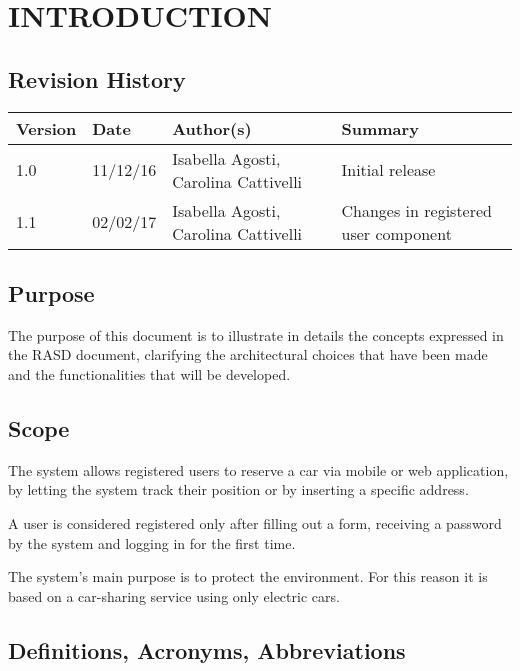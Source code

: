 \section{INTRODUCTION}
\subsection{Revision History}
\begin{table}[h]
	\centering
	\begin{tabular}{| m{1.5cm} | m{1.6cm} | m{5cm} | m{3.9cm} |}
		\hline
		\textbf{Version} & \textbf{Date} & \textbf{Author(s)} & \textbf{Summary}\\
		\hline
		1.0 & 11/12/16 & Isabella Agosti, Carolina Cattivelli & Initial release\\
		\hline
		1.1 & 02/02/17 & Isabella Agosti, Carolina Cattivelli & Changes in registered user component\\
		\hline
	\end{tabular}
\end{table}

\subsection{Purpose}
The purpose of this document is to illustrate in details the concepts expressed in the RASD document, clarifying the architectural choices that have been made and the functionalities that will be developed.
\subsection{Scope}
The system allows registered users to reserve a car via mobile or web application, by letting the system track their position or by inserting a specific address.

A user is considered registered only after filling out a form, receiving a password by the system and logging in for the first time.

The system's main purpose is to protect the environment. For this reason it is based on a car-sharing service using only electric cars.
\newpage 
\subsection{Definitions, Acronyms, Abbreviations} 
